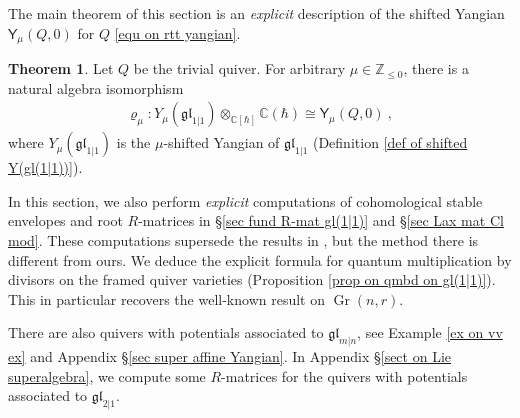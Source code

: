\documentclass[10pt]{amsart}
\theoremstyle{definition}
\newtheorem{Theorem}{Theorem}[section]
\numberwithin{equation}{section}
\newcommand{\bC}{\mathbb{C}}
\newcommand{\bZ}{\mathbb{Z}}
\newcommand{\Gr}{\operatorname{Gr}}
\begin{document}
The main theorem of this section is an \textit{explicit} description of the shifted Yangian $\mathsf Y_{\mu}(Q,0)$ for $Q$ \eqref{equ on rtt yangian}. 
\begin{Theorem}\label{thm ex trivial quiver_main}
Let $Q$ be the trivial quiver. For arbitrary $\mu\in \bZ_{\leqslant 0}$, there is a natural algebra isomorphism
\begin{align*}
    \varrho_\mu\colon Y_{\mu}(\mathfrak{gl}_{1|1})\otimes_{\bC[\hbar]} \bC(\hbar)\cong \mathsf Y_{\mu}(Q,0)\:,
\end{align*}
where $Y_{\mu}(\mathfrak{gl}_{1|1})$ is the 
$\mu$-shifted Yangian of $\mathfrak{gl}_{1|1}$ (Definition \ref{def of shifted Y(gl(1|1))}).
\end{Theorem} 


In this section, we also perform \textit{explicit} computations of cohomological stable envelopes and root $R$-matrices in \S \ref{sec fund R-mat gl(1|1)} and 
\S \ref{sec Lax mat Cl mod}. These computations supersede the results in \cite[\S 7.2]{IMZ}, but the method there is different from ours. We deduce the explicit formula for quantum multiplication by divisors on the framed quiver varieties (Proposition \ref{prop on qmbd on gl(1|1)}). This in particular recovers the well-known result on $\Gr(n,r)$.

There are also quivers with potentials associated to $\mathfrak{gl}_{m|n}$, see Example \ref{ex on vv ex} and Appendix \S \ref{sec super affine Yangian}. In Appendix \S \ref{sect on Lie superalgebra}, we compute some $R$-matrices for the quivers with potentials associated to $\mathfrak{gl}_{2|1}$.
\end{document}
